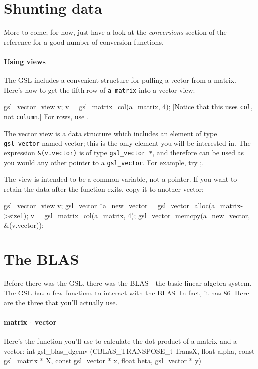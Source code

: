 \section{Shunting data} \label{asst_conversions}  

More to come; for now, just have a look at the {\sl conversions} section
of the reference for a good number of conversion functions.

\paragraph{Using views}
The GSL includes a convenient structure for pulling a vector from a
matrix. Here's how to get the fifth row of {\tt a\_matrix} into a vector view:

gsl_vector_view v;
v = gsl_matrix_col(a_matrix, 4);
[Notice that this uses {\tt col}, not {\tt column}.]
For rows, use . 

The vector view is a data structure which includes an element of type {\tt gsl\_vector}
named vector; this is the only element you will be interested in. The
expression {\tt \&(v.vector)} is of type {\tt gsl\_vector *}, and therefore can
be used as you would any other pointer to a {\tt gsl\_vector}. For example,
try ;.

The view is intended to be a common variable, not a pointer. If you want
to retain the data after the function exits, copy it to another vector:

gsl_vector_view v;
gsl_vector *a_new_vector = gsl_vector_alloc(a_matrix->size1);
v = gsl_matrix_col(a_matrix, 4);
gsl_vector_memcpy(a_new_vector, &(v.vector));



\section{The BLAS} 
Before there was the GSL, there was the BLAS---the basic linear algebra system. The GSL has a few
functions to interact with the BLAS. In fact, it has 86. Here are the three that you'll
actually use.

\paragraph{matrix $\cdot$ vector} Here's the function you'll use to calculate the dot product of a
matrix and a vector:
int gsl_blas_dgemv (CBLAS_TRANSPOSE_t TransX, float alpha, 
          const gsl_matrix * X, const gsl_vector * x, 
          float beta, gsl_vector * y)

